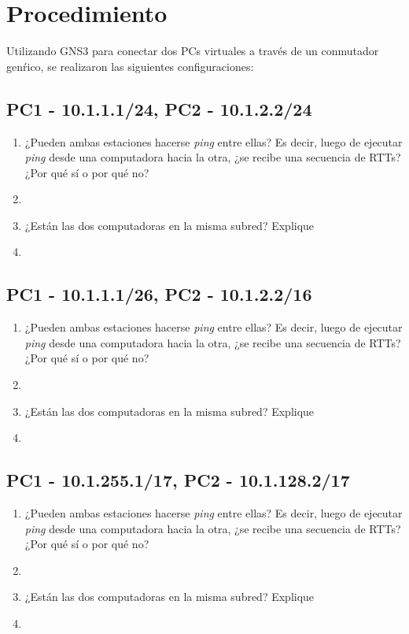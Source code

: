\section*{Procedimiento}

\noindent Utilizando GNS3 para conectar dos PCs virtuales a trav\'es de un conmutador gen\'rico, se realizaron las siguientes
configuraciones:

\subsection*{PC1 - 10.1.1.1/24, PC2 - 10.1.2.2/24}
\begin{enumerate}
  \item ¿Pueden ambas estaciones hacerse \textit{ping} entre ellas? Es decir, luego de ejecutar \textit{ping} desde una computadora
  hacia la otra, ¿se recibe una secuencia de RTTs?¿Por qu\'e s\'i o por qu\'e no?
  \item[]

  \item ¿Est\'an las dos computadoras en la misma subred? Explique
  \item[]
\end{enumerate}

\subsection*{PC1 - 10.1.1.1/26, PC2 - 10.1.2.2/16}
\begin{enumerate}
  \item ¿Pueden ambas estaciones hacerse \textit{ping} entre ellas? Es decir, luego de ejecutar \textit{ping} desde una computadora
  hacia la otra, ¿se recibe una secuencia de RTTs?¿Por qu\'e s\'i o por qu\'e no?
  \item[]

  \item ¿Est\'an las dos computadoras en la misma subred? Explique
  \item[]
\end{enumerate}

\subsection*{PC1 - 10.1.255.1/17, PC2 - 10.1.128.2/17}
\begin{enumerate}
  \item ¿Pueden ambas estaciones hacerse \textit{ping} entre ellas? Es decir, luego de ejecutar \textit{ping} desde una computadora
  hacia la otra, ¿se recibe una secuencia de RTTs?¿Por qu\'e s\'i o por qu\'e no?
  \item[]

  \item ¿Est\'an las dos computadoras en la misma subred? Explique
  \item[]
\end{enumerate}

